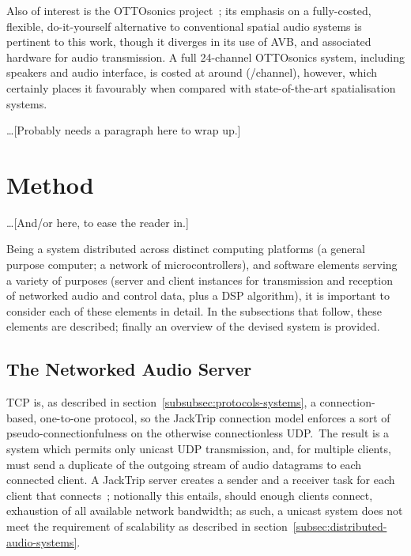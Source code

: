 \documentclass[utf8]{FrontiersinHarvard}
\newcommand{\secref}[1]{section~\ref{#1}}
\begin{document}
    Also of interest is the OTTOsonics project~\citep{mitterhuber_ottosonics_2022};
    its emphasis on a fully-costed, flexible, do-it-yourself alternative to
    conventional spatial audio systems is pertinent to this work, though it diverges
    in its use of AVB, and associated hardware for audio transmission.
    A full 24-channel OTTOsonics system, including speakers and audio interface, is
    costed at around  (/channel), however, which
    certainly places it favourably when compared with state-of-the-art
    spatialisation systems.


    \dots [Probably needs a paragraph here to wrap up.]

    \section{Method}\label{sec:method}

    \dots [And/or here, to ease the reader in.]

    Being a system distributed across distinct computing platforms (a general
    purpose computer; a network of microcontrollers), and software elements
    serving a variety of purposes (server and client instances for transmission
    and reception of networked audio and control data, plus a DSP algorithm), it is
    important to consider each of these elements in detail.
    In the subsections that follow, these elements are described;
    finally an overview of the devised system is provided.

    \subsection{The Networked Audio Server}\label{subsec:the-networked-audio-server}

    TCP is, as described in \secref{subsubsec:protocols-systems}, a
    connection-based, one-to-one protocol, so the JackTrip connection model enforces
    a sort of pseudo-connectionfulness on the otherwise connectionless UDP.\
    The result is a system which permits only unicast UDP transmission, and, for
    multiple clients, must send a duplicate of the outgoing stream of audio
    datagrams to each connected client.
    A JackTrip server creates a sender and a receiver task for each client that
    connects~\citep{caceres_jacktrip_2010};
    notionally this entails, should enough clients connect, exhaustion of all
    available network bandwidth;
    as such, a unicast system does not meet the requirement of scalability as
    described in \secref{subsec:distributed-audio-systems}.
\end{document}
